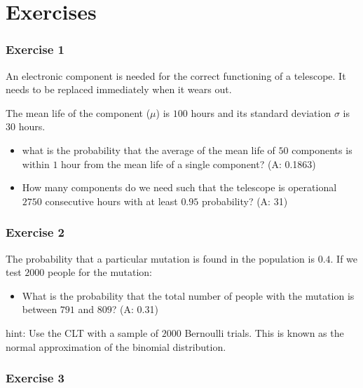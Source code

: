 \documentclass[
]{book}
\providecommand{\tightlist}{%
  \setlength{\itemsep}{0pt}\setlength{\parskip}{0pt}}
\begin{document}
\hypertarget{exercises-9}{%
\section{Exercises}\label{exercises-9}}

\hypertarget{exercise-1-8}{%
\subsubsection{Exercise 1}\label{exercise-1-8}}

An electronic component is needed for the correct functioning of a telescope. It needs to be replaced immediately when it wears out.

The mean life of the component (\(\mu\)) is \(100\) hours and its standard deviation \(\sigma\) is \(30\) hours.

\begin{itemize}
\item
  what is the probability that the average of the mean life of \(50\) components is within \(1\) hour from the mean life of a single component? (A: 0.1863)
\item
  How many components do we need such that the telescope is operational \(2750\) consecutive hours with at least \(0.95\) probability? (A: 31)
\end{itemize}

\hypertarget{exercise-2-8}{%
\subsubsection{Exercise 2}\label{exercise-2-8}}

The probability that a particular mutation is found in the population is \(0.4\). If we test \(2000\) people for the mutation:

\begin{itemize}
\tightlist
\item
  What is the probability that the total number of people with the mutation is between \(791\) and \(809\)? (A: 0.31)
\end{itemize}

hint: Use the CLT with a sample of \(2000\) Bernoulli trials. This is known as the normal approximation of the binomial distribution.

\hypertarget{exercise-3-6}{%
\subsubsection{Exercise 3}\label{exercise-3-6}}
\end{document}
